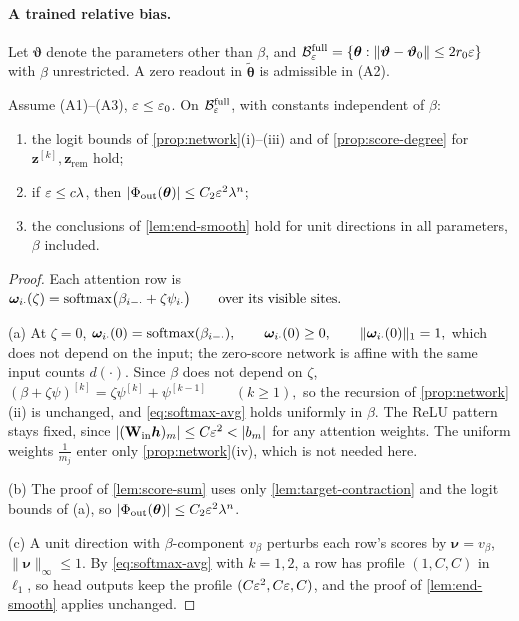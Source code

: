 \paragraph{A trained relative bias.} Let $\bm\vartheta$ denote the parameters other than $\beta$, and
$\mathcal B^{\mathrm{full}}_{\varepsilon}=\{\bm\theta:\|\bm\vartheta-\bm\vartheta_0\|\le2r_0\varepsilon\}$ with $\beta$ unrestricted. A zero readout in $\tilde{\bm\theta}$ is admissible in (A2).

\begin{lemma}
\label{lem:bias-uniform}
Assume (A1)--(A3), $\varepsilon\le\varepsilon_0$. On $\mathcal B^{\mathrm{full}}_{\varepsilon}$, with constants independent of $\beta$:
\begin{enumerate}[label=(\alph*),leftmargin=*,itemsep=1pt,topsep=2pt]
\item the logit bounds of \cref{prop:network}(i)--(iii) and of \cref{prop:score-degree} for $\bm z^{[k]},\bm z_{\mathrm{rem}}$ hold;
\item if $\varepsilon\le c\lambda$, then $|\Phi_{\mathrm{out}}(\bm\theta)|\le C_2\varepsilon^2\lambda^n$;
\item the conclusions of \cref{lem:end-smooth} hold for unit directions in all parameters, $\beta$ included.
\end{enumerate}
\end{lemma}

\begin{proof}
Each attention row is
 $\bm\omega_{i\cdot}(\zeta)=\operatorname{softmax}\bigl(\beta_{i-\cdot}+\zeta\psi_{i\cdot}\bigr)\qquad\text{over its visible sites.}$ 

\noindent(a) At $\zeta=0$,
 $\bm\omega_{i\cdot}(0)=\operatorname{softmax}(\beta_{i-\cdot}),\qquad \bm\omega_{i\cdot}(0)\ge0,\qquad \|\bm\omega_{i\cdot}(0)\|_1=1,$ 
which does not depend on the input; the zero-score network is affine with the same input counts $d(\cdot)$. Since $\beta$ does not
depend on $\zeta$,
 $(\beta+\zeta\psi)^{[k]}=\zeta\psi^{[k]}+\psi^{[k-1]}\qquad(k\ge1),$ 
so the recursion of \cref{prop:network}(ii) is unchanged, and \cref{eq:softmax-avg} holds uniformly in $\beta$. The ReLU pattern stays
fixed, since $|(\mathbf W_{\mathrm{in}}\bm h)_m|\le C\initscale^2<|b_m|$ for any attention weights. The uniform weights $\frac{1}{m_j}$ enter only
\cref{prop:network}(iv), which is not needed here.

\smallskip\noindent(b) The proof of \cref{lem:score-sum} uses only \cref{lem:target-contraction} and the logit bounds of (a), so
$|\Phi_{\mathrm{out}}(\bm\theta)|\le C_2\varepsilon^2\lambda^n$.

\smallskip\noindent(c) A unit direction with $\beta$-component $v_\beta$ perturbs each row's scores by $\bm\nu=v_\beta$, $\|\bm\nu\|_\infty\le1$. By
\cref{eq:softmax-avg} with $k=1,2$, a row has profile $(1,C,C)$ in $\ell_1$, so head outputs keep the profile $(C\varepsilon^2,C\varepsilon,C)$, and the
proof of \cref{lem:end-smooth} applies unchanged.
\end{proof}

